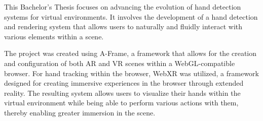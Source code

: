 \documentclass[a4paper, 12pt]{book}
\begin{document}
This Bachelor's Thesis focuses on advancing the evolution of hand detection systems for virtual environments. It involves the development of a hand detection and rendering system that allows users to naturally and fluidly interact with various elements within a scene.

The project was created using A-Frame, a framework that allows for the creation and configuration of both AR and VR scenes within a WebGL-compatible browser. For hand tracking within the browser, WebXR was utilized, a framework designed for creating immersive experiences in the browser through extended reality. The resulting system allows users to visualize their hands within the virtual environment while being able to perform various actions with them, thereby enabling greater immersion in the scene.


\tableofcontents
\cleardoublepage
\listoffigures %



\cleardoublepage
\end{document}
